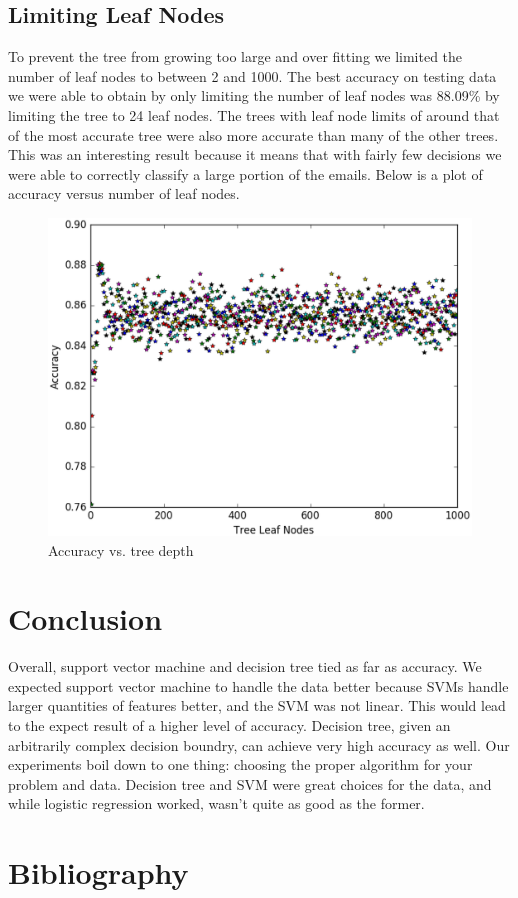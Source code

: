 \documentclass{article} %
\begin{document}
\subsection{Limiting Leaf Nodes}
To prevent the tree from growing too large and over fitting we limited the number
of leaf nodes to between 2 and 1000. The best accuracy on testing data we were
able to obtain by only limiting the number of leaf nodes was 88.09\% by limiting
the tree to 24 leaf nodes. The trees with leaf node limits of around that of
the most accurate tree were also more accurate than many of the other trees.
This was an interesting result because it means that with fairly few decisions
we were able to correctly classify a large portion of the emails. Below is a
plot of accuracy versus number of leaf nodes.
\begin{figure}[H]
\includegraphics[scale=.5]{accuracy-vs-nodes}
\caption{Accuracy vs. tree depth}
\end{figure}


\section{Conclusion}
Overall, support vector machine and decision tree tied as far as accuracy. We expected
support vector machine to handle the data better because SVMs handle larger quantities
of features better, and the SVM was not linear. This would lead to the expect result
of a higher level of accuracy. Decision tree, given an arbitrarily complex decision
boundry, can achieve very high accuracy as well. Our experiments boil down to one
thing: choosing the proper algorithm for your problem and data. Decision tree
and SVM were great choices for the data, and while logistic regression worked, wasn't
quite as good as the former.

\clearpage

\section{Bibliography}


\end{document}
